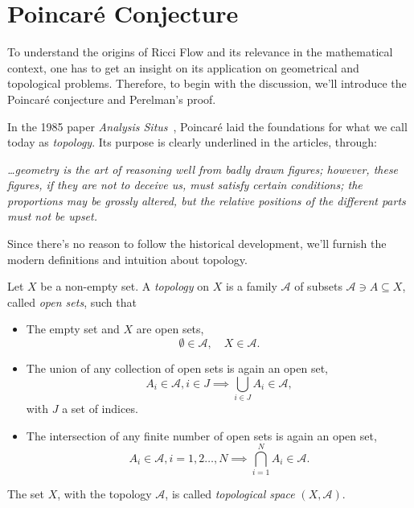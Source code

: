 \section{Poincaré Conjecture}
To understand the origins of Ricci Flow and its relevance in the mathematical context, one has to get an insight on its application on geometrical and topological problems. Therefore, to begin with the discussion, we'll introduce the Poincaré conjecture and Perelman's proof. 

In the 1985 paper \emph{Analysis Situs}~\cite{poincare:analysis-situs}, Poincaré laid the foundations for what we call today as \emph{topology}. Its purpose is clearly underlined in the articles, through:
\begin{quoting}
    \noindent \emph{\dots geometry is the art of reasoning well from badly drawn figures; however, these figures, if they are not to deceive us, must satisfy certain conditions; the proportions may be grossly altered, but the relative positions of the different parts must not be upset.}
\end{quoting}

Since there's no reason to follow the historical development, we'll furnish the modern definitions and intuition about topology.

\begin{definition}
    Let $X$ be a non-empty set. A \emph{topology} on $X$ is a family $\mathcal{A}$ of subsets $\mathcal{A} \ni A \subseteq X$, called \emph{open sets}, such that
    \begin{itemize}
        \item The empty set and $X$ are open sets,
        \begin{equation}
            \emptyset \in \mathcal{A}, \quad X     \in \mathcal{A}.
        \end{equation}
        \item The union of any collection of open sets is again an open set,
        \begin{equation}
            A_i \in \mathcal{A}, i \in J \implies \bigcup_{i \in J} A_i \in \mathcal{A},
        \end{equation}
        with $J$ a set of indices.
        \item The intersection of any finite number of open sets is again an open set,
        \begin{equation}
            A_i \in \mathcal{A}, i = 1, 2 \dots, N \implies \bigcap_{i=1}^N A_i \in \mathcal{A}.
        \end{equation}
    \end{itemize}    

    The set $X$, with the topology $\mathcal{A}$, is called \emph{topological space} $(X, \mathcal{A})$.
\end{definition}

